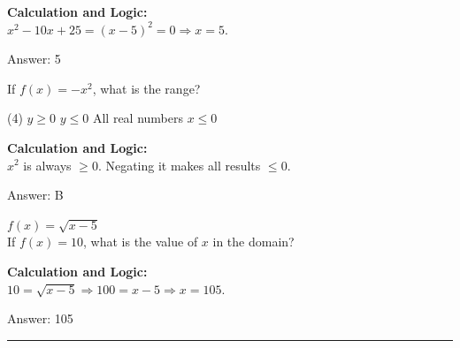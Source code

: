 \documentclass[11pt,paper=a4,answers]{exam}
\begin{document}
\begin{questions}
\begin{solution}
\textbf{Calculation and Logic:} \\
$x^2 - 10x + 25 = (x-5)^2 = 0 \Rightarrow x = 5$.

\vspace{30pt}

Answer: \colorbox{yellow!100}{5}
\end{solution}

\vspace{40pt}

\question
If $f(x) = -x^2$, what is the range?
\begin{tasks}(4)
    \task $y \geq 0$
    \task $y \leq 0$
    \task All real numbers
    \task $x \leq 0$
\end{tasks}

\begin{solution}
\textbf{Calculation and Logic:} \\
$x^2$ is always $\geq 0$. Negating it makes all results $\leq 0$.

\vspace{30pt}

Answer: \colorbox{yellow!100}{B}
\end{solution}

\vspace{40pt}

\question
$f(x) = \sqrt{x-5}$ \\
If $f(x) = 10$, what is the value of $x$ in the domain?

\begin{solution}
\textbf{Calculation and Logic:} \\
$10 = \sqrt{x-5} \Rightarrow 100 = x-5 \Rightarrow x = 105$.

\vspace{30pt}

Answer: \colorbox{yellow!100}{105}
\end{solution}


\end{questions}
\begin{center}
\rule{.5\textwidth}{1pt}
\end{center}
\end{document}
